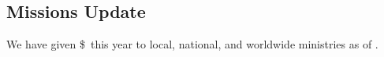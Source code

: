  \vfill 

\subsection{Missions Update}
\label{missionsupdate}

 We have given \$\missions \ this year to local, national, and worldwide ministries as of \givingupdatedate.

 \vfill 

